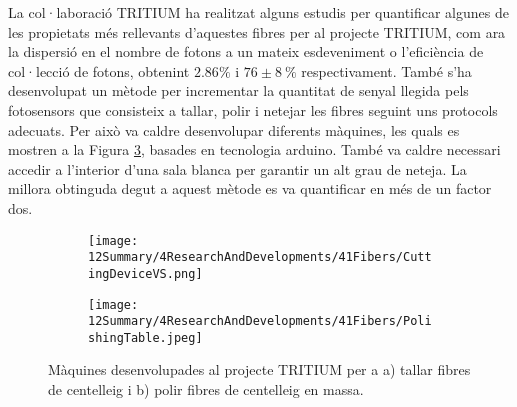 La col·laboració TRITIUM ha realitzat alguns estudis per quantificar algunes de les propietats més rellevants d'aquestes fibres per al projecte TRITIUM, com ara la dispersió en el nombre de fotons a un mateix esdeveniment o l'eficiència de col·lecció de fotons, obtenint $2.86\%$ i $76 \pm 8~\%$ respectivament. També s'ha desenvolupat un mètode per incrementar la quantitat de senyal llegida pels fotosensors que consisteix a tallar, polir i netejar les fibres seguint uns protocols adecuats. Per això va caldre desenvolupar diferents màquines, les quals es mostren a la Figura \ref{fig:MaquinesTRITIUM}, basades en tecnologia arduino. També va caldre necessari accedir a l'interior d'una sala blanca per garantir un alt grau de neteja. La millora obtinguda degut a aquest mètode es va quantificar en més de un factor dos. 

\begin{figure}
\centering
    \begin{subfigure}[b]{0.5\textwidth}
    \centering
    \texttt{[image: 12Summary/4ResearchAndDevelopments/41Fibers/CuttingDeviceVS.png]}  
    \caption{\label{subfig:MaquinaTallar}}
    \end{subfigure}
    \hfill
    \begin{subfigure}[b]{0.45\textwidth}
    \centering
    \texttt{[image: 12Summary/4ResearchAndDevelopments/41Fibers/PolishingTable.jpeg]}  
    \caption{\label{subfig:MaquinaPolir}}
    \end{subfigure}
 \caption{Màquines desenvolupades al projecte TRITIUM per a a) tallar fibres de centelleig i b) polir fibres de centelleig en massa. \label{fig:MaquinesTRITIUM}}
\end{figure}